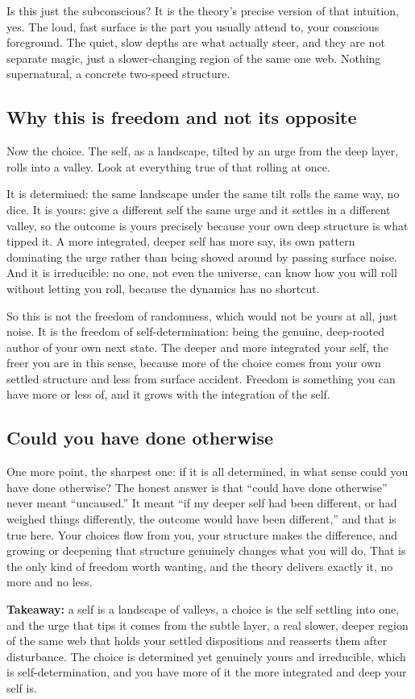 Is this just the subconscious? It is the theory's precise version of that intuition, yes. The loud, fast surface is the part you usually attend to, your conscious foreground. The quiet, slow depths are what actually steer, and they are not separate magic, just a slower-changing region of the same one web. Nothing supernatural, a concrete two-speed structure.

\subsection{Why this is freedom and not its opposite}

Now the choice. The self, as a landscape, tilted by an urge from the deep layer, rolls into a valley. Look at everything true of that rolling at once.

It is determined: the same landscape under the same tilt rolls the same way, no dice. It is yours: give a different self the same urge and it settles in a different valley, so the outcome is yours precisely because your own deep structure is what tipped it. A more integrated, deeper self has more say, its own pattern dominating the urge rather than being shoved around by passing surface noise. And it is irreducible: no one, not even the universe, can know how you will roll without letting you roll, because the dynamics has no shortcut.

So this is not the freedom of randomness, which would not be yours at all, just noise. It is the freedom of self-determination: being the genuine, deep-rooted author of your own next state. The deeper and more integrated your self, the freer you are in this sense, because more of the choice comes from your own settled structure and less from surface accident. Freedom is something you can have more or less of, and it grows with the integration of the self.

\subsection{Could you have done otherwise}

One more point, the sharpest one: if it is all determined, in what sense could you have done otherwise? The honest answer is that ``could have done otherwise'' never meant ``uncaused.'' It meant ``if my deeper self had been different, or had weighed things differently, the outcome would have been different,'' and that is true here. Your choices flow from you, your structure makes the difference, and growing or deepening that structure genuinely changes what you will do. That is the only kind of freedom worth wanting, and the theory delivers exactly it, no more and no less.

\textbf{Takeaway:} a self is a landscape of valleys, a choice is the self settling into one, and the urge that tips it comes from the subtle layer, a real slower, deeper region of the same web that holds your settled dispositions and reasserts them after disturbance. The choice is determined yet genuinely yours and irreducible, which is self-determination, and you have more of it the more integrated and deep your self is.
